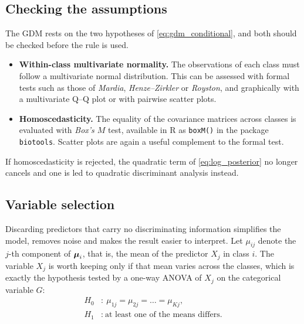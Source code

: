 \subsection{Checking the assumptions}
\label{subsec:lda_assumptions}

The GDM rests on the two hypotheses of \eqref{eq:gdm_conditional}, and both
should be checked before the rule is used.

\begin{itemize}
  \item \textbf{Within-class multivariate normality.} The observations of each
        class must follow a multivariate normal distribution. This can be
        assessed with formal tests such as those of \emph{Mardia},
        \emph{Henze--Zirkler} or \emph{Royston}, and graphically with a
        multivariate Q--Q plot or with pairwise scatter plots.
  \item \textbf{Homoscedasticity.} The equality of the covariance matrices
        across classes is evaluated with \emph{Box's $M$} test, available in
        \textsf{R} as \texttt{boxM()} in the package \texttt{biotools}.
        Scatter plots are again a useful complement to the formal test.
\end{itemize}

If homoscedasticity is rejected, the quadratic term of \eqref{eq:log_posterior}
no longer cancels and one is led to quadratic discriminant analysis instead.

\subsection{Variable selection}
\label{subsec:lda_variable_selection}

Discarding predictors that carry no discriminating information simplifies the
model, removes noise and makes the result easier to interpret. Let $\mu_{ij}$
denote the $j$-th component of $\boldsymbol{\mu}_i$, that is, the mean of the predictor
$X_j$ in class $i$. The variable $X_j$ is worth keeping only if that mean varies
across the classes, which is exactly the hypothesis tested by a one-way ANOVA of
$X_j$ on the categorical variable $G$:
\begin{equation}
  \label{eq:anova_hypotheses}
  \begin{aligned}
    H_0&:\ \mu_{1j}=\mu_{2j}=\dots=\mu_{Kj},\\
    H_1&:\ \text{at least one of the means differs.}
  \end{aligned}
\end{equation}

